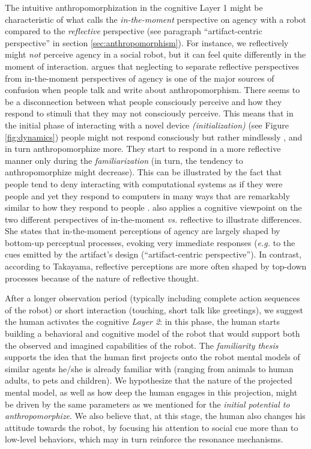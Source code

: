 \documentclass{frontiersSCNS} %
\newcommand{\eg}{\textit{e.g.}\xspace}
\newcommand{\vs}{\textit{vs.}\xspace}
\begin{document}
The intuitive anthropomorphization in the cognitive Layer 1 might be
characteristic of what \cite{takayama_perspectives_2012} calls the
\textit{in-the-moment} perspective on agency with a robot compared to the
\textit{reflective} perspective (see paragraph ``artifact-centric perspective''
in section \ref{sec:anthropomorphism}).  For instance, we reflectively might
\textit{not} perceive agency in a social robot, but it can feel quite
differently in the moment of interaction. \cite{takayama_perspectives_2012}
argues that neglecting to separate reflective perspectives from in-the-moment
perspectives of agency is one of the major sources of confusion when people talk
and write about anthropomorphism. There seems to be a disconnection between what
people consciously perceive and how they respond to stimuli that they may not
consciously perceive. This means that in the initial phase of interacting with a
novel device \textit{(initialization)} (see Figure \ref{fig:dynamics}) people
might not respond consciously but rather mindlessly \citep{nass_machines_2000},
and in turn anthropomorphize more. They start to respond in a more reflective
manner only during the \textit{familiarization} (in turn, the tendency to
anthropomorphize might decrease). This can be illustrated by the fact that
people tend to deny interacting with computational systems as if they were
people and yet they respond to computers in many ways that are remarkably
similar to how they respond to people \citep{reeves_media_1996}.
\cite{takayama_perspectives_2012} also applies a cognitive viewpoint on the two
different perspectives of in-the-moment \vs reflective to illustrate
differences. She states that in-the-moment perceptions of agency are largely
shaped by bottom-up perceptual processes, evoking very immediate responses (\eg
to the cues emitted by the artifact's design (``artifact-centric
perspective''). In contrast, according to Takayama, reflective perceptions are
more often shaped by top-down processes because of the nature of reflective
thought.

After a longer observation period (typically including complete action sequences
of the robot) or short interaction (touching, short talk like greetings), we
suggest the human activates the cognitive \emph{Layer 2}: in this phase, the human
starts building a behavioral and cognitive model of the robot that would support
both the observed and imagined capabilities of the robot.  The \emph{familiarity
thesis}~\citep{hegel_understanding_2008} supports the idea that the human first
projects onto the robot mental models of similar agents he/she is already
familiar with (ranging from animals to human adults, to pets and children). We
hypothesize that the nature of the projected mental model, as well as how deep
the human engages in this projection, might be driven by the same parameters as
we mentioned for the \emph{initial potential to anthropomorphize}. We also believe
that, at this stage, the human also changes his attitude towards the robot, by
focusing his attention to social cue more than to low-level behaviors, which
may in turn reinforce the resonance mechanisms.
\end{document}
